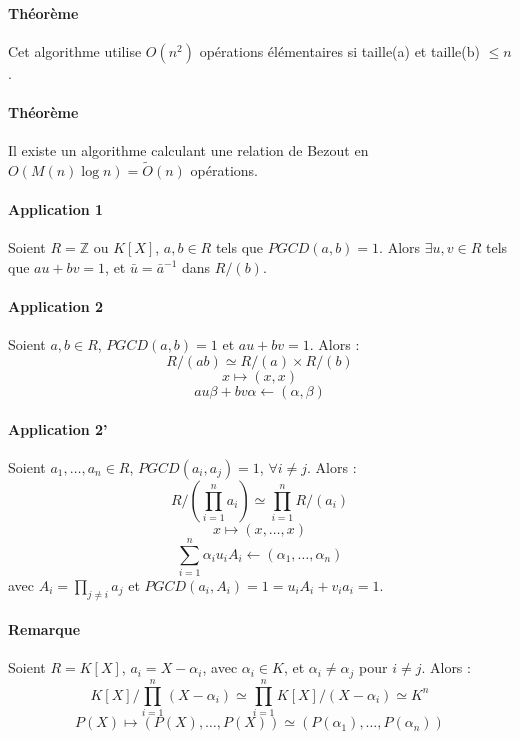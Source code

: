 \documentclass[12pt,a4paper]{report}
\begin{document}
\paragraph{Théorème\\}
Cet algorithme utilise $O(n^2)$ opérations élémentaires si taille(a) et taille(b) $\leqslant n$.
\paragraph{Théorème\\}
Il existe un algorithme calculant une relation de Bezout en $O(M(n) \log n) = \tilde{O}(n)$ opérations.
\paragraph{Application 1\\}
Soient $R = \mathbb{Z}$ ou $ K[X]$, $a,b \in R$ tels que $PGCD(a,b)=1$. Alors $\exists u,v \in R$ tels que $au+bv=1$,  et $\bar{u}=\bar{a}^{-1}$ dans $R/(b)$.
\paragraph{Application 2\\}
Soient $a,b \in R$, $PGCD(a,b)=1$ et $ au+bv=1$. Alors :
$$R/(ab) \simeq R/(a) \times R/(b) $$
$$ x \mapsto (x,x) $$
$$ au\beta + bv\alpha \leftarrow (\alpha,\beta) $$
\paragraph{Application 2'\\}
Soient $a_1,\ldots,a_n \in R$, $PGCD(a_i,a_j) = 1$, $\forall i\neq j$. Alors :
$$ R/\left(\prod_{i=1}^n a_i\right) \simeq \prod_{i=1}^n R/(a_i) $$
$$ x \mapsto (x,\ldots,x) $$
$$ \sum_{i=1}^n \alpha_i u_i A_i \leftarrow (\alpha_1,\ldots,\alpha_n)$$
avec $A_i = \prod_{j\neq i} a_j$ et $ PGCD(a_i,A_i) =1 = u_i A_i + v_i a_i =1$.
\paragraph{Remarque\\}
Soient $R=K[X]$, $a_i = X-\alpha_i$, avec $\alpha_i \in K$, et $\alpha_i \neq \alpha_j$ pour $ i\neq j$. Alors :
$$ K[X] / \prod_{i=1}^n (X-\alpha_i) \simeq \prod_{i=1}^n K[X] / (X-\alpha_i) \simeq K^n $$
$$ P(X) \mapsto (P(X), \ldots, P(X)) \simeq (P(\alpha_1),\ldots, P(\alpha_n))$$
\end{document}
